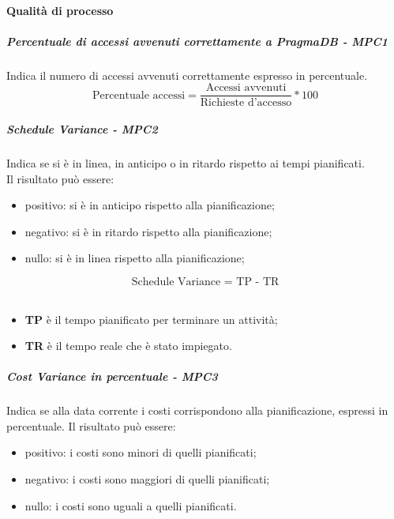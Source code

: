 \paragraph{Qualità di processo}
\subparagraph{Percentuale di accessi avvenuti correttamente a PragmaDB - MPC1}
Indica il numero  di accessi avvenuti correttamente espresso in percentuale.\\
\begin{equation*} 
\text{Percentuale accessi} = \frac{\text{Accessi avvenuti}}{\text{Richieste d'accesso}} * 100
\end{equation*}
\subparagraph{Schedule Variance - MPC2}
Indica se si è in linea, in anticipo o in ritardo rispetto ai tempi pianificati.\\
Il risultato può essere:
\begin{itemize}
	\item positivo: si è in anticipo rispetto alla pianificazione;
	\item negativo: si è in ritardo rispetto alla pianificazione;
	\item nullo: si è in linea rispetto alla pianificazione;\\
\end{itemize} 
\begin{equation*}
\text{Schedule Variance = TP - TR} 
\end{equation*}\\
\begin{itemize}
	\item \textbf{TP} è il tempo pianificato per terminare un attività;
	\item \textbf{TR} è il tempo reale che è stato impiegato.
\end{itemize}		
\subparagraph{Cost Variance in percentuale - MPC3}
Indica se alla data corrente i costi corrispondono alla pianificazione, espressi in percentuale.
Il risultato può essere:
\begin{itemize}
	\item positivo: i costi sono minori di quelli pianificati;
	\item negativo: i costi sono maggiori di quelli pianificati;
	\item nullo: i costi sono uguali a quelli pianificati.\\
\end{itemize}

